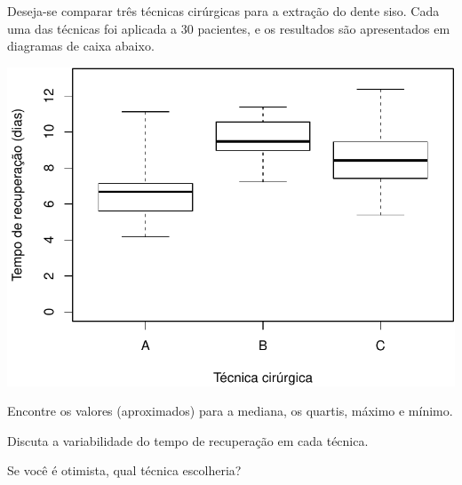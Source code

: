 \documentclass[a4paper,11pt,fleqn]{article}\usepackage[]{graphicx}\usepackage[]{color}
\newenvironment{knitrout}{}{} %
\theoremstyle{definition}
\begin{document}
\begin{compactenum}[5.] %
\item Deseja-se comparar três técnicas cirúrgicas para a extração do
  dente siso. Cada uma das técnicas foi aplicada a 30 pacientes, e os
  resultados são apresentados em diagramas de caixa abaixo.\vspace{1em}
\begin{knitrout}\small
{}\color{fgcolor}

{\centering \includegraphics[width=.5\textwidth]{figure/siso-1} 

}



\end{knitrout}
\begin{compactenum}
\item Encontre os valores (aproximados) para a mediana, os quartis,
  máximo e mínimo.

\item Discuta a variabilidade do tempo de recuperação em cada técnica.
\item Se você é otimista, qual técnica escolheria?
\end{compactenum}
\end{compactenum}
\end{document}
